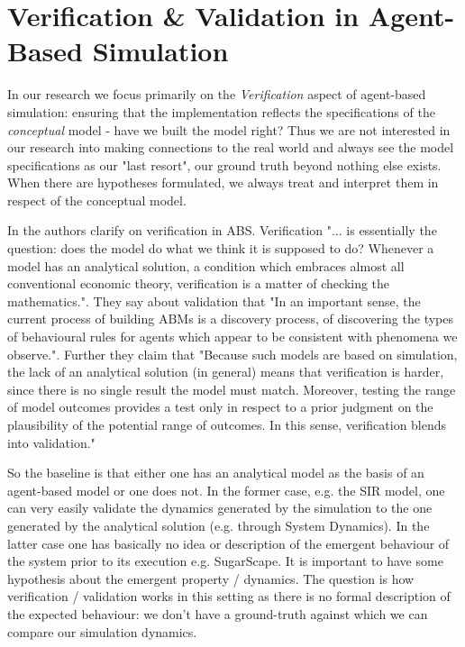 \section{Verification \& Validation in Agent-Based Simulation}
\label{sec:vav_abs}
In our research we focus primarily on the \textit{Verification} aspect of agent-based simulation: ensuring that the implementation reflects the specifications of the \textit{conceptual} model - have we built the model right? Thus we are not interested in our research into making connections to the real world and always see the model specifications as our "last resort", our ground truth beyond nothing else exists. When there are hypotheses formulated, we always treat and interpret them in respect of the conceptual model.

In \cite{ormerod_validation_2006} the authors clarify on verification in ABS. Verification "... is essentially the question: does the model do what we think it is supposed to do? Whenever a model has an analytical solution, a condition which embraces almost all conventional economic theory, verification is a matter of checking the mathematics.". They say about validation that "In an important sense, the current process of building ABMs is a discovery process, of discovering the types of behavioural rules for agents which appear to be consistent with phenomena we observe.". Further they claim that "Because such models are based on simulation, the lack of an analytical solution (in general) means that verification is harder, since there is no single result the model must match. Moreover, testing the range of model outcomes provides a test only in respect to a prior judgment on the plausibility of the potential range of outcomes. In this sense, verification blends into validation."

So the baseline is that either one has an analytical model as the basis of an agent-based model or one does not. In the former case, e.g. the SIR model, one can very easily validate the dynamics generated by the simulation to the one generated by the analytical solution (e.g. through System Dynamics). In the latter case one has basically no idea or description of the emergent behaviour of the system prior to its execution e.g. SugarScape. It is important to have some hypothesis about the emergent property / dynamics. The question is how verification / validation works in this setting as there is no formal description of the expected behaviour: we don't have a ground-truth against which we can compare our simulation dynamics. %

